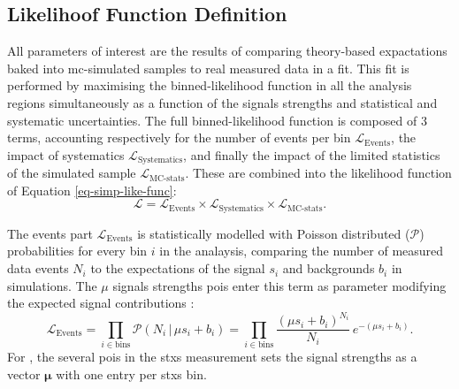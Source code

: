 \subsection{Likelihoof Function Definition}\label{subsec-likelidef}
All parameters of interest are the results of comparing theory-based expactations baked into \gls{mc}-simulated samples to real measured data in a fit. This fit is performed by maximising the binned-likelihood function in all the analysis regions simultaneously as a function of the signals strengths and statistical and systematic uncertainties. The full binned-likelihood function is composed of 3 terms, accounting respectively for the number of events per bin $\mathcal{L}_{\text{Events}}$, the impact of systematics $\mathcal{L}_{\text{Systematics}}$, and finally the impact of the limited statistics of the simulated sample $\mathcal{L}_{\text{MC-stats}}$. These are combined into the likelihood function of Equation \ref{eq-simp-like-func}: 
\begin{equation}\label{eq-simp-like-func}
    \mathcal{L} = \mathcal{L}_{\text{Events}} \times \mathcal{L}_{\text{Systematics}} \times \mathcal{L}_{\text{MC-stats}}.
\end{equation}

The events part $\mathcal{L}_{\text{Events}}$ is statistically modelled with Poisson distributed ($\mathcal{P}$) probabilities for every bin $i$ in the analaysis, comparing the number of measured data events $N_i$ to the expectations of the signal $s_i$ and backgrounds $b_i$ in simulations. The $\mu$ signals strengths \gls{poi}s enter this term as parameter modifying the expected signal contributions : \[\mathcal{L}_{\text{Events}} = \prod_{i\in \textrm{bins}} \mathcal{P}(N_i \,|\, \mu s_i + b_i) = \prod_{i\in \textrm{bins}} \frac{\left(\mu s_i + b_i\right)^{N_i}}{N_i} \, e^{-\left(\mu s_i + b_i\right)}.\] For \vhb, the several \gls{poi}s in the \gls{stxs} measurement sets the signal strengths as a vector $\boldsymbol{\mu}$ with one entry per \gls{stxs} bin.\\

